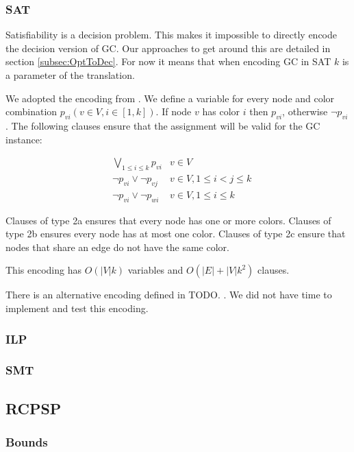 \documentclass{sig-alternate}
\begin{document}
\subsubsection*{SAT}

Satisfiability is a decision problem. This makes it impossible to directly encode the decision version of GC. Our approaches to get around this are detailed in section \ref{subsec:OptToDec}. For now it means that when encoding GC in SAT $k$ is a parameter of the translation.

We adopted the encoding from \cite{cs395tGCtoSAT}. We define a variable for every node and color combination $p_{vi} (v \in V, i \in [1,k])$. If node $v$ has color $i$ then $p_{vi}$, otherwise $\neg p_{vi}$. The following clauses ensure that the assignment will be valid for the GC instance:

\setcounter{equation}{1}
\begin{subequations}
\begin{align}
        & \bigvee_{1 \leq i \leq k} p_{vi}& v \in V\\
        & \neg p_{vi} \lor \neg p_{vj} & v \in V, 1 \leq i < j \leq k \\
        & \neg p_{vi} \lor \neg p_{wi} & v \in V, 1 \leq i \leq k
\end{align}
\end{subequations}

Clauses of type 2a ensures that every node has one or more colors. Clauses of type 2b ensures every node has at most one color. Clauses of type 2c ensure that nodes that share an edge do not have the same color.

This encoding has $O(|V| k)$ variables and $O(|E|+|V| k^2)$ clauses.

There is an alternative encoding defined in TODO. . We did not have time to implement and test this encoding.

\subsubsection*{ILP}
\subsubsection*{SMT}


\subsection{RCPSP}

\subsubsection*{Bounds}
\end{document}
